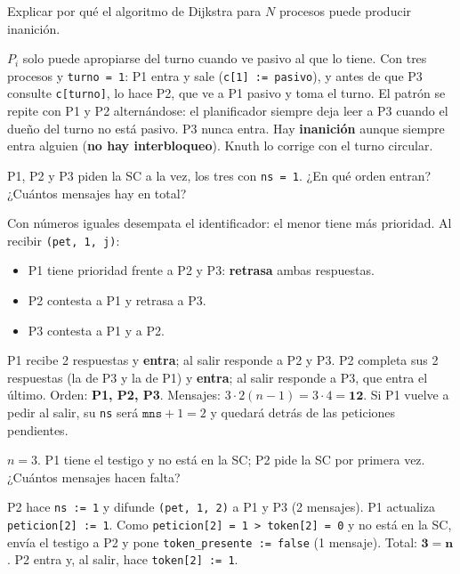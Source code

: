 \documentclass[11pt,a4paper,oneside]{report}
\begin{document}
\begin{ejercicio}
Explicar por qué el algoritmo de Dijkstra para $N$ procesos puede producir inanición.
\end{ejercicio}
\begin{solucion}
$P_i$ solo puede apropiarse del turno cuando ve pasivo al que lo tiene. Con tres procesos y \texttt{turno = 1}:
P1 entra y sale (\texttt{c[1] := pasivo}), y antes de que P3 consulte \texttt{c[turno]}, lo hace P2, que ve a P1
pasivo y toma el turno. El patrón se repite con P1 y P2 alternándose: el planificador siempre deja leer a P3 cuando
el dueño del turno no está pasivo. P3 nunca entra. Hay \textbf{inanición} aunque siempre entra alguien (\textbf{no
hay interbloqueo}). Knuth lo corrige con el turno circular.
\end{solucion}

\begin{ejercicio}
P1, P2 y P3 piden la SC a la vez, los tres con \texttt{ns = 1}. ¿En qué orden entran? ¿Cuántos mensajes hay en
total?
\end{ejercicio}
\begin{solucion}
Con números iguales desempata el identificador: el menor tiene más prioridad. Al recibir \texttt{(pet, 1, j)}:
\begin{itemize}[leftmargin=*,noitemsep]
  \item P1 tiene prioridad frente a P2 y P3: \textbf{retrasa} ambas respuestas.
  \item P2 contesta a P1 y retrasa a P3.
  \item P3 contesta a P1 y a P2.
\end{itemize}
P1 recibe 2 respuestas y \textbf{entra}; al salir responde a P2 y P3. P2 completa sus 2 respuestas (la de P3 y la de
P1) y \textbf{entra}; al salir responde a P3, que entra el último. Orden: \textbf{P1, P2, P3}. Mensajes:
$3 \cdot 2(n-1) = 3 \cdot 4 = \mathbf{12}$. Si P1 vuelve a pedir al salir, su \texttt{ns} será
$\texttt{mns}+1 = 2$ y quedará detrás de las peticiones pendientes.
\end{solucion}

\begin{ejercicio}
$n = 3$. P1 tiene el testigo y no está en la SC; P2 pide la SC por primera vez. ¿Cuántos mensajes hacen falta?
\end{ejercicio}
\begin{solucion}
P2 hace \texttt{ns := 1} y difunde \texttt{(pet, 1, 2)} a P1 y P3 (2 mensajes). P1 actualiza
\texttt{peticion[2] := 1}. Como \texttt{peticion[2] = 1 > token[2] = 0} y no está en la SC, envía el testigo a P2 y
pone \texttt{token\_presente := false} (1 mensaje). Total: $\mathbf{3 = n}$. P2 entra y, al salir, hace
\texttt{token[2] := 1}.
\end{solucion}
\end{document}

